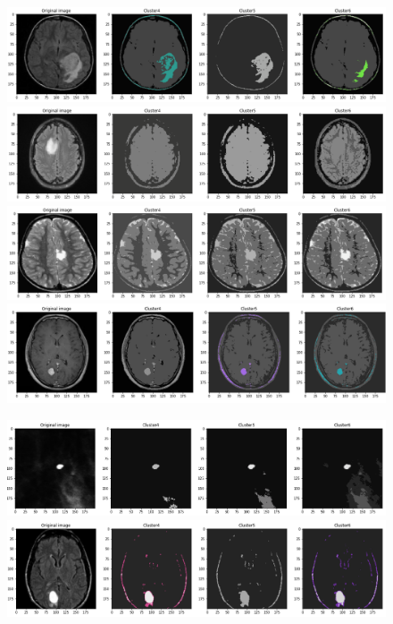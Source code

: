 \documentclass{article}
\begin{document}
\begin{figure}[h!]
\centerline{\includegraphics[scale=0.45]{images/segmented_k_means10.png}}
\centerline{\includegraphics[scale=0.45]{images/segmented_k_means11.png}}
\centerline{\includegraphics[scale=0.45]{images/segmented_k_means9.png}}
\centerline{\includegraphics[scale=0.45]{images/segmented_k_means2.png}}
\end{figure}

\newpage

\begin{figure}[h!]
\centerline{\includegraphics[scale=0.45]{images/segmented_k_means12.png}}
\centerline{\includegraphics[scale=0.45]{images/segmented_k_means13.png}}

\end{figure}
\end{document}
